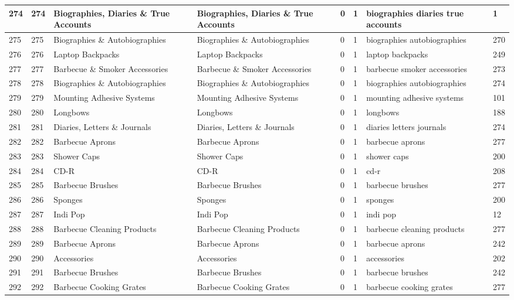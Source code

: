 \begin{longtable}{|l|l|l|l|l|l|l|l|}
274 & 274 & Biographies, Diaries \& True Accounts & Biographies, Diaries \& True Accounts & 0 & 1 & biographies diaries true accounts & 1 \\ \hline 
275 & 275 & Biographies \& Autobiographies & Biographies \& Autobiographies & 0 & 1 & biographies autobiographies & 270 \\ \hline 
276 & 276 & Laptop Backpacks & Laptop Backpacks & 0 & 1 & laptop backpacks & 249 \\ \hline 
277 & 277 & Barbecue \& Smoker Accessories & Barbecue \& Smoker Accessories & 0 & 1 & barbecue smoker accessories & 273 \\ \hline 
278 & 278 & Biographies \& Autobiographies & Biographies \& Autobiographies & 0 & 1 & biographies autobiographies & 274 \\ \hline 
279 & 279 & Mounting Adhesive Systems & Mounting Adhesive Systems & 0 & 1 & mounting adhesive systems & 101 \\ \hline 
280 & 280 & Longbows & Longbows & 0 & 1 & longbows & 188 \\ \hline 
281 & 281 & Diaries, Letters \& Journals & Diaries, Letters \& Journals & 0 & 1 & diaries letters journals & 274 \\ \hline 
282 & 282 & Barbecue Aprons & Barbecue Aprons & 0 & 1 & barbecue aprons & 277 \\ \hline 
283 & 283 & Shower Caps & Shower Caps & 0 & 1 & shower caps & 200 \\ \hline 
284 & 284 & CD-R & CD-R & 0 & 1 & cd-r & 208 \\ \hline 
285 & 285 & Barbecue Brushes & Barbecue Brushes & 0 & 1 & barbecue brushes & 277 \\ \hline 
286 & 286 & Sponges & Sponges & 0 & 1 & sponges & 200 \\ \hline 
287 & 287 & Indi Pop & Indi Pop & 0 & 1 & indi pop & 12 \\ \hline 
288 & 288 & Barbecue Cleaning Products & Barbecue Cleaning Products & 0 & 1 & barbecue cleaning products & 277 \\ \hline 
289 & 289 & Barbecue Aprons & Barbecue Aprons & 0 & 1 & barbecue aprons & 242 \\ \hline 
290 & 290 & Accessories & Accessories & 0 & 1 & accessories & 202 \\ \hline 
291 & 291 & Barbecue Brushes & Barbecue Brushes & 0 & 1 & barbecue brushes & 242 \\ \hline 
292 & 292 & Barbecue Cooking Grates & Barbecue Cooking Grates & 0 & 1 & barbecue cooking grates & 277 \\ \hline 

\end{longtable}
